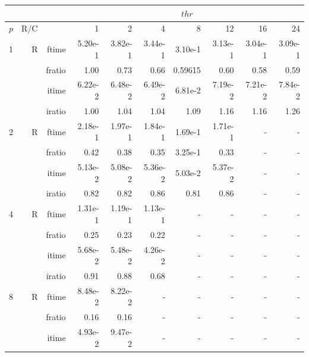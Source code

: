 \documentclass[a4paper]{article}
\begin{document}
\begin{table}[htbp]
\begin{center}
\begin{small}
\begin{tabular}{|r|r|r|r|r|r|r|r|r|r|}
\hline 
     & & & \multicolumn{7}{c|}{$thr$} \\ \hline
    $p$ & R/C &  & 1           & 2    & 4    & 8    & 12   & 16    & 24  \\ \hline\hline
   1 &  R &   ftime &    5.20e-1 &    3.82e-1 &    3.44e-1 &    3.10e-1 &    3.13e-1 &    3.04e-1 &    3.09e-1 \\
             &             &  fratio &    1.00 &    0.73 &    0.66 &    0.59615 &    0.60 &    0.58 &    0.59 \\
             &             &  itime &    6.22e-2 &    6.48e-2 &    6.49e-2 &    6.81e-2 &    7.19e-2 &    7.21e-2 &    7.84e-2 \\
             &             &  iratio &    1.00 &    1.04  &    1.04  &    1.09  &    1.16  &    1.16  &    1.26  \\\hline
   2 &  R &   ftime &    2.18e-1 &    1.97e-1 &    1.84e-1 &    1.69e-1 &    1.71e-1 &      - &      - \\
             &             &  fratio &   0.42 &    0.38 &    0.35 &    3.25e-1 &    0.33 &      - &      - \\
             &             &  itime &    5.13e-2 &    5.08e-2 &    5.36e-2 &    5.03e-2 &    5.37e-2 &      - &      - \\
             &             &  iratio &    0.82 &   0.82 &    0.86 &   0.81 &    0.86 &      - &      - \\\hline
   4 &  R &   ftime &    1.31e-1 &    1.19e-1 &    1.13e-1 &      - &      - &      - &      - \\
             &             &  fratio &    0.25 &    0.23 &   0.22 &      - &      - &      - &      - \\
             &             &  itime &    5.68e-2 &    5.48e-2 &    4.26e-2 &      - &      - &      - &      - \\
             &             &  iratio &    0.91 &    0.88 &    0.68 &      - &      - &      - &      - \\\hline
   8 &   R &   ftime &    8.48e-2 &    8.22e-2 &      - &      - &      - &      - &      - \\
             &             &  fratio &    0.16 &    0.16 &      - &      - &      - &      - &      - \\
             &             &  itime &    4.93e-2 &    9.47e-2 &      - &      - &      - &      - &      - \\

\end{tabular}
\end{small}
\end{center}
\end{table}
\end{document}
